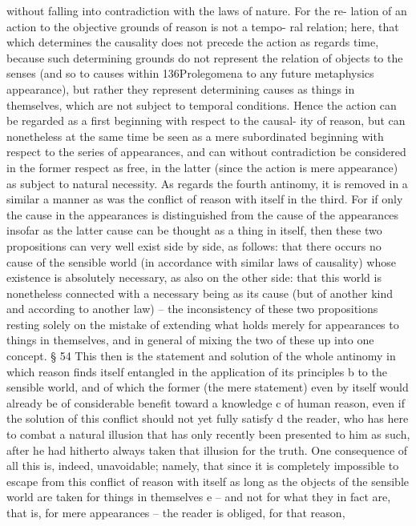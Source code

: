 without falling into contradiction with the laws of nature. For the re-
lation of an action to the objective grounds of reason is not a tempo-
ral relation; here, that which determines the causality does not precede
the action as regards time, because such determining grounds do not
represent the relation of objects to the senses (and so to causes within
136Prolegomena to any future metaphysics
appearance), but rather they represent determining causes as things in
themselves, which are not subject to temporal conditions. Hence the
action can be regarded as a ﬁrst beginning with respect to the causal-
ity of reason, but can nonetheless at the same time be seen as a mere
subordinated beginning with respect to the series of appearances, and
can without contradiction be considered in the former respect as free,
in the latter (since the action is mere appearance) as subject to natural
necessity.
As regards the fourth antinomy, it is removed in a similar a manner
as was the conﬂict of reason with itself in the third. For if only the
cause in the appearances is distinguished from the cause of the appearances
insofar as the latter cause can be thought as a thing in itself, then these
two propositions can very well exist side by side, as follows: that there
occurs no cause of the sensible world (in accordance with similar laws
of causality) whose existence is absolutely necessary, as also on the other
side: that this world is nonetheless connected with a necessary being
as its cause (but of another kind and according to another law) – the
inconsistency of these two propositions resting solely on the mistake of
extending what holds merely for appearances to things in themselves,
and in general of mixing the two of these up into one concept.
§ 54
This then is the statement and solution of the whole antinomy in which
reason ﬁnds itself entangled in the application of its principles b to the
sensible world, and of which the former (the mere statement) even by
itself would already be of considerable beneﬁt toward a knowledge c of
human reason, even if the solution of this conﬂict should not yet fully
satisfy d the reader, who has here to combat a natural illusion that has
only recently been presented to him as such, after he had hitherto always
taken that illusion for the truth. One consequence of all this is, indeed,
unavoidable; namely, that since it is completely impossible to escape from
this conﬂict of reason with itself as long as the objects of the sensible
world are taken for things in themselves e – and not for what they in fact
are, that is, for mere appearances – the reader is obliged, for that reason,
